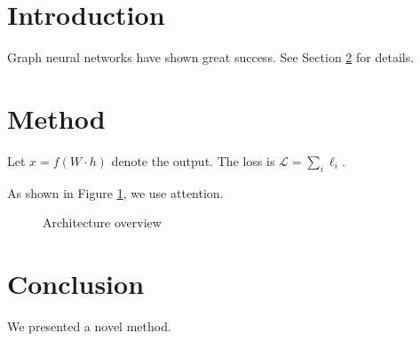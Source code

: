 \documentclass{article}
\begin{document}
\begin{abstract}
This paper presents a method for graph learning.
\end{abstract}

\section{Introduction}
\label{sec:intro}
Graph neural networks \cite{kipf2017gcn} have shown great success.
See Section \ref{sec:method} for details.

\section{Method}
\label{sec:method}
Let $x = f(W \cdot h)$ denote the output.
The loss is $\mathcal{L} = \sum_{i} \ell_i$.

As shown in Figure \ref{fig:arch}, we use attention.

\begin{figure}[t]
\centering
\caption{Architecture overview}
\label{fig:arch}
\end{figure}

\section{Conclusion}
We presented a novel method.


\end{document}
